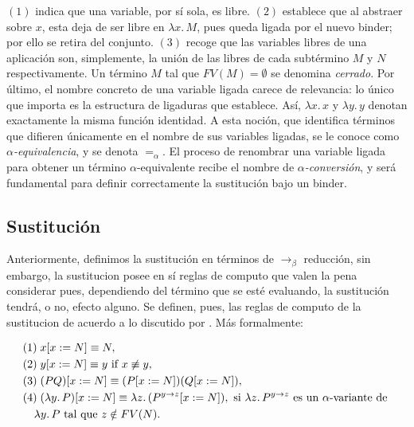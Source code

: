 \documentclass[a4paper,12pt]{report}
\theoremstyle{definition}
\theoremstyle{plain}
\theoremstyle{remark}
\begin{document}
$(1)$ indica que una variable, por s\'i sola, es libre. $(2)$ establece
que al abstraer sobre $x$, esta deja de ser libre en $\lambda x.\, M$, pues queda ligada por
el nuevo binder; por ello se retira del conjunto. $(3)$ recoge que las variables libres de
una aplicaci\'on son, simplemente, la uni\'on de las libres de cada subt\'ermino $M$ y $N$ respectivamente. Un t\'ermino
$M$ tal que $FV(M) = \emptyset$ se denomina \textit{cerrado}.
\newline
\newline
Por \'ultimo, el nombre concreto de una variable ligada carece de relevancia: lo \'unico que
importa es la estructura de ligaduras que establece. As\'i, $\lambda x.\, x$ y
$\lambda y.\, y$ denotan exactamente la misma funci\'on identidad. A esta noci\'on, que
identifica t\'erminos que difieren \'unicamente en el nombre de sus variables ligadas, se le
conoce como \textit{$\alpha$-equivalencia}, y se denota $=_\alpha$. El proceso de renombrar
una variable ligada para obtener un t\'ermino $\alpha$-equivalente recibe el nombre de
\textit{$\alpha$-conversi\'on}, y ser\'a fundamental para definir correctamente la
sustituci\'on bajo un binder.
\subsection{Sustitución}
Anteriormente, definimos la sustitución en términos de $\to_\beta$ reducción, sin embargo, la sustitucion posee en sí reglas de computo que valen la pena considerar pues, dependiendo del término que se esté evaluando, la sustitución tendrá, o no, efecto alguno.
\newline
\newline
Se definen, pues, las reglas de computo de la sustitucion de acuerdo a lo discutido por \cite{pierce2002}. Más formalmente:

\begin{align}
& (1) \; x[x := N] \equiv N, \notag \\
& (2) \; y[x := N] \equiv y \text{ if } x \not\equiv y, \notag \\
& (3) \; (PQ)[x := N] \equiv (P[x := N])(Q[x := N]), \notag \\
& (4) \; (\lambda y.\, P)[x := N] \equiv \lambda z.\, (P^{y \to z}[x := N]),
  \text{ si } \lambda z.\, P^{y \to z} \text{ es un } \alpha\text{-variante de } \notag \\
& \quad \lambda y.\, P \text{ tal que } z \notin FV(N). \notag
\end{align}
\end{document}
